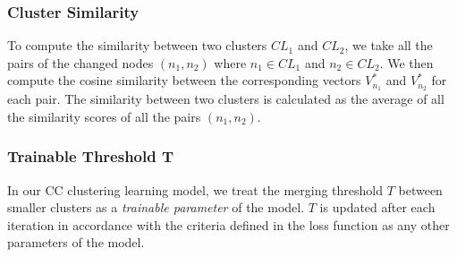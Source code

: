 \subsubsection*{{\bf Cluster Similarity}} To compute the similarity between
two clusters $CL_1$ and $CL_2$, we take all the pairs of the changed
nodes $(n_1,n_2)$ where $n_1 \in CL_1$ and $n_2 \in CL_2$. We
then compute the cosine similarity between the corresponding vectors
$V^{*}_{n_1}$ and $V^{*}_{n_2}$ for each pair. The similarity between
two clusters is calculated as the average of all the similarity scores
of all the pairs $(n_1,n_2)$.

\subsubsection*{{\bf Trainable Threshold T}} In our CC clustering learning model,
we treat the merging threshold $T$ between smaller clusters as a {\em
  trainable parameter} of the model. $T$ is updated after each
iteration in accordance with the criteria defined in the loss function
as any other parameters of the model.




